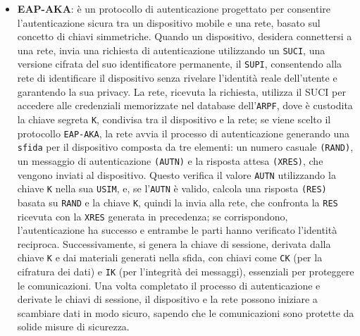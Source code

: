 \documentclass[english]{article}
\begin{document}
\begin{itemize}
	\item \textbf{\hypertarget{EAP-AKA}{EAP-AKA}}: è un protocollo di autenticazione
	      progettato per consentire l'autenticazione sicura tra un dispositivo mobile e una rete,
	      basato sul concetto di chiavi simmetriche.
	      Quando un dispositivo, desidera connettersi a una rete,
	      invia una richiesta di autenticazione utilizzando un \texttt{SUCI},
	      una versione cifrata del suo identificatore permanente, il \texttt{SUPI},
	      consentendo alla rete di identificare il dispositivo senza rivelare
	      l’identità reale dell’utente e garantendo la sua privacy.
	      La rete, ricevuta la richiesta, utilizza il SUCI per accedere alle credenziali
	      memorizzate nel database dell’\texttt{ARPF}, dove è custodita la chiave segreta \texttt{K},
	      condivisa tra il dispositivo e la rete; se viene scelto il protocollo \texttt{EAP-AKA},
	      la rete avvia il processo di autenticazione generando una \texttt{sfida}
	      per il dispositivo composta da tre elementi: un numero casuale \texttt{(RAND)},
	      un messaggio di autenticazione \texttt{(AUTN)} e la risposta attesa \texttt{(XRES)}, che vengono
	      inviati al dispositivo. Questo verifica il valore \texttt{AUTN} utilizzando la chiave \texttt{K} nella sua \texttt{USIM},
	      e, se l'\texttt{AUTN} è valido, calcola una risposta \texttt{(RES)} basata su \texttt{RAND} e la chiave \texttt{K},
	      quindi la invia alla rete, che confronta la \texttt{RES} ricevuta con la \texttt{XRES} generata in precedenza;
	      se corrispondono, l’autenticazione ha successo e entrambe le parti hanno verificato
	      l'identità reciproca. Successivamente, si genera la chiave di sessione,
	      derivata dalla chiave \texttt{K} e dai materiali generati nella sfida,
	      con chiavi come \texttt{CK} (per la cifratura dei dati) e \texttt{IK} (per l’integrità dei messaggi),
	      essenziali per proteggere le comunicazioni. Una volta completato il processo di
	      autenticazione e derivate le chiavi di sessione, il dispositivo e la rete possono
	      iniziare a scambiare dati in modo sicuro, sapendo che le comunicazioni sono protette
	      da solide misure di sicurezza.


\end{itemize}
\end{document}
